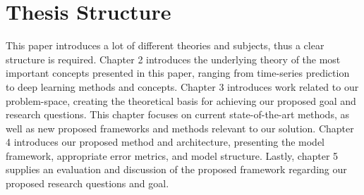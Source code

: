 
\section{Thesis Structure}
\label{sections:Introduction:Structure}

This paper introduces a lot of different theories and subjects,
thus a clear structure is required.
Chapter 2 introduces the underlying theory of the most important concepts presented in this paper,
ranging from time-series prediction to deep learning methods and concepts.
Chapter 3 introduces work related to our problem-space, creating the theoretical basis for achieving our proposed goal and research questions.
This chapter focuses on current state-of-the-art methods,
as well as new proposed frameworks and methods relevant to our solution.
Chapter 4 introduces our proposed method and architecture,
presenting the model framework, appropriate error metrics, and model structure.
Lastly, chapter 5 supplies an evaluation and discussion of the proposed framework regarding our proposed research questions and goal.


